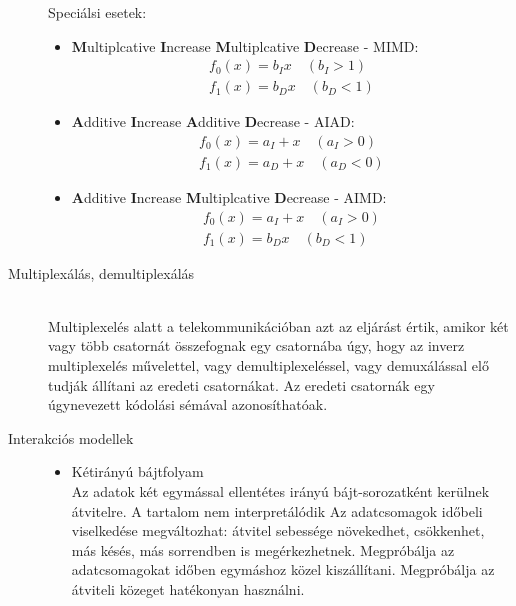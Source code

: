 \documentclass[margin=0px]{article}
\begin{document}
\begin{description}
        Speciálsi esetek:
        \begin{itemize}
            \item \textbf{M}ultiplcative \textbf{I}ncrease \textbf{M}ultiplcative \textbf{D}ecrease - MIMD:
                  \begin{align*}
                      f_0(x) = b_Ix \quad (b_I > 1) \\
                      f_1(x) = b_Dx \quad (b_D < 1)
                  \end{align*}
            \item \textbf{A}dditive \textbf{I}ncrease \textbf{A}dditive \textbf{D}ecrease - AIAD:
                  \begin{align*}
                      f_0(x) = a_I+x \quad (a_I > 0) \\
                      f_1(x) = a_D+x \quad (a_D < 0)
                  \end{align*}
            \item \textbf{A}dditive \textbf{I}ncrease \textbf{M}ultiplcative \textbf{D}ecrease - AIMD:
                  \begin{align*}
                      f_0(x) = a_I+x \quad (a_I > 0) \\
                      f_1(x) = b_Dx \quad (b_D < 1)
                  \end{align*}
        \end{itemize}

    \item[Multiplexálás, demultiplexálás] \hfill \\
        Multiplexelés alatt a telekommunikációban azt az eljárást értik, amikor két vagy több csatornát összefognak egy csatornába úgy, hogy az inverz multiplexelés művelettel, vagy demultiplexeléssel, vagy demuxálással elő tudják állítani az eredeti csatornákat. Az eredeti csatornák egy úgynevezett kódolási sémával azonosíthatóak.
    \item[Interakciós modellek] \hfill
        \begin{itemize}
            \item Kétirányú bájtfolyam \\
                  Az adatok két egymással ellentétes irányú bájt-sorozatként kerülnek átvitelre. A tartalom nem interpretálódik Az adatcsomagok időbeli viselkedése megváltozhat: átvitel sebessége növekedhet, csökkenhet, más késés, más sorrendben is megérkezhetnek. Megpróbálja az adatcsomagokat időben egymáshoz közel kiszállítani. Megpróbálja az átviteli közeget hatékonyan használni.


\end{itemize}
\end{description}
\end{document}
